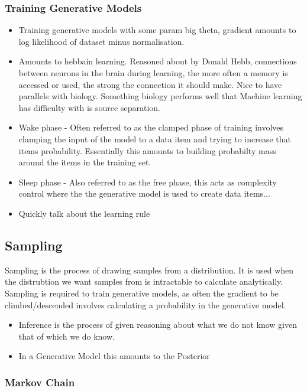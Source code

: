  \subsubsection{Training Generative Models}
  \begin{itemize}
    \item Training generative models with some param big theta, gradient amounts to log likelihood of dataset minus normalisation.
    \item Amounts to hebbain learning. Reasoned about by Donald Hebb, connections between neurons in the brain during learning, the more often a memory is accessed or used, the strong the connection it should make. Nice to have parallels with biology. Something biology performs well that Machine learning has difficulty with is source separation.
    \item Wake phase - Often referred to as the clamped phase of training involves clamping the input of the model to a data item and trying to increase that items probability. Essentially this amounts to building probabilty mass around the items in the training set.
    \item Sleep phase - Also referred to as the free phase, this acts as complexity control where the the generative model is used to create data items...
    \item Quickly talk about the learning rule
  \end{itemize}

\subsection{Sampling}

Sampling is the process of drawing samples from a distribution. It is used when the distrubtion we want samples from is intractable to calculate analytically. Sampling is required to train generative models, as often the gradient to be climbed/descended involves calculating a probability in the
generative model.

\begin{itemize}
  \item Inference is the process of given reasoning about what we do not know given that of which we do know.
  \item In a Generative Model this amounts to the Posterior
\end{itemize}

  \subsubsection{Markov Chain}

